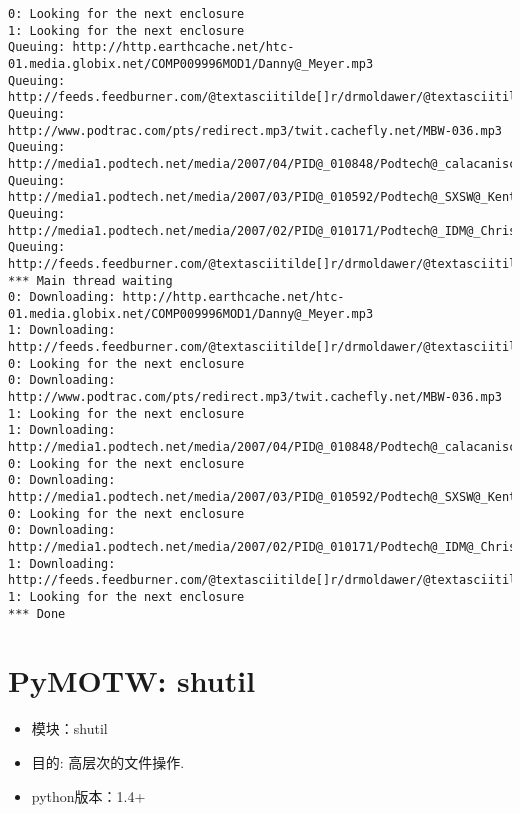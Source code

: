 \documentclass[letterpaper,10pt,english]{manual}
\begin{document}
\begin{Verbatim}[commandchars=@\[\]]
0: Looking for the next enclosure
1: Looking for the next enclosure
Queuing: http://http.earthcache.net/htc-01.media.globix.net/COMP009996MOD1/Danny@_Meyer.mp3
Queuing: http://feeds.feedburner.com/@textasciitilde[]r/drmoldawer/@textasciitilde[]5/104445110/moldawerinthemorning@_show34@_032607.mp3
Queuing: http://www.podtrac.com/pts/redirect.mp3/twit.cachefly.net/MBW-036.mp3
Queuing: http://media1.podtech.net/media/2007/04/PID@_010848/Podtech@_calacaniscast22@_ipod.mp4
Queuing: http://media1.podtech.net/media/2007/03/PID@_010592/Podtech@_SXSW@_KentBrewster@_ipod.mp4
Queuing: http://media1.podtech.net/media/2007/02/PID@_010171/Podtech@_IDM@_ChrisOBrien2.mp3
Queuing: http://feeds.feedburner.com/@textasciitilde[]r/drmoldawer/@textasciitilde[]5/96188661/moldawerinthemorning@_show30@_022607.mp3
*** Main thread waiting
0: Downloading: http://http.earthcache.net/htc-01.media.globix.net/COMP009996MOD1/Danny@_Meyer.mp3
1: Downloading: http://feeds.feedburner.com/@textasciitilde[]r/drmoldawer/@textasciitilde[]5/104445110/moldawerinthemorning@_show34@_032607.mp3
0: Looking for the next enclosure
0: Downloading: http://www.podtrac.com/pts/redirect.mp3/twit.cachefly.net/MBW-036.mp3
1: Looking for the next enclosure
1: Downloading: http://media1.podtech.net/media/2007/04/PID@_010848/Podtech@_calacaniscast22@_ipod.mp4
0: Looking for the next enclosure
0: Downloading: http://media1.podtech.net/media/2007/03/PID@_010592/Podtech@_SXSW@_KentBrewster@_ipod.mp4
0: Looking for the next enclosure
0: Downloading: http://media1.podtech.net/media/2007/02/PID@_010171/Podtech@_IDM@_ChrisOBrien2.mp3
1: Downloading: http://feeds.feedburner.com/@textasciitilde[]r/drmoldawer/@textasciitilde[]5/96188661/moldawerinthemorning@_show30@_022607.mp3
1: Looking for the next enclosure
*** Done
\end{Verbatim}

\resetcurrentobjects


\section{PyMOTW: shutil}
\begin{itemize}
\item {} 
模块：shutil

\item {} 
目的: 高层次的文件操作.

\item {} 
python版本：1.4+

\end{itemize}
\end{document}
